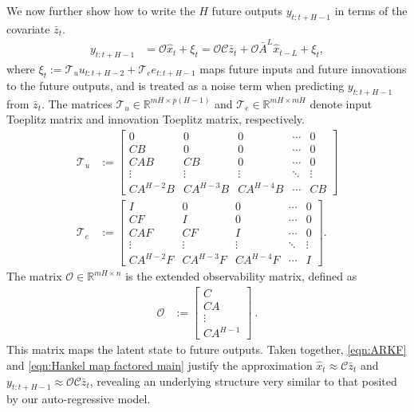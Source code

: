 \documentclass[11pt]{article}
\newcommand{\Abar}{\bar{A}}
\newcommand{\zbar}{\bar{z}}
\newcommand{\xtil}{\hat{x}}
\newcommand{\Ccal}{\mathcal{C}}
\newcommand{\Hcal}{\mathcal{H}}
\newcommand{\Ocal}{\mathcal{O}}
\newcommand{\Tcal}{\mathcal{T}}
\newcommand{\R}{\mathbb{R}}				%
\newcommand{\<}{\langle}
\renewcommand{\>}{\rangle}
\numberwithin{equation}{section}
\begin{document}
We now further show how to write the $H$ future outputs $y_{t:t+H-1}$ in terms of the covariate $\zbar_t$.
\begin{align}\label{eqn:Hankel map factored main}
    y_{t:t+H-1} %
    &= \Ocal \xtil_t + \xi_t
    = \Ocal \Ccal \zbar_t + \Ocal \Abar^L \xtil_{t-L} + \xi_t ,
\end{align}
where $\xi_t := \Tcal_u u_{t:t+H-2} + \Tcal_e e_{t:t+H-1}$ maps future inputs and future innovations to the future outputs, and is treated as a noise term when predicting $y_{t:t+H-1}$ from $\zbar_t$.
The matrices $\Tcal_{u} \in \R^{mH \times p(H-1)}$ and $\Tcal_{e} \in \R^{mH \times mH}$ denote input Toeplitz matrix and innovation Toeplitz matrix, respectively. 
\begin{align*}
    \Tcal_u &:= \begin{bmatrix} 
    0 & 0  & 0 &\cdots & 0 \\
    C B & 0 & 0 &\cdots & 0 \\
    C A B & C B  & 0 & \cdots & 0 \\
    \vdots & \vdots & \vdots & \ddots &\vdots \\
    C A^{H-2} B & C A^{H-3}B & C A^{H-4} B & \cdots & C B 
    \end{bmatrix}  \\
    \Tcal_e &:= \begin{bmatrix} 
    I & 0  & 0 & \cdots & 0 \\
    C F & I & 0 & \cdots & 0 \\
    C A F & C F  & I & \cdots & 0 \\
    \vdots & \vdots & \vdots & \ddots &\vdots \\
    C A^{H-2} F & C A^{H-3} F & C A^{H-4} F & \cdots & I 
    \end{bmatrix}.
\end{align*}
The matrix $\Ocal \in \R^{mH \times n}$ is the extended observability matrix, defined as
\begin{align}
   \Ocal&:= \begin{bmatrix} 
    C \\ C A \\ \vdots \\ C A^{H-1}\end{bmatrix}\:. \label{eqn:extended observability}
\end{align}
This matrix maps the latent state to future outputs. Taken together, \eqref{eqn:ARKF} and \eqref{eqn:Hankel map factored main} justify the approximation $\xtil_{t} \approx \Ccal \zbar_t$ and $y_{t:t+H-1} \approx \Ocal\Ccal \zbar_t$, revealing an underlying structure very similar to that posited by our auto-regressive model.
\end{document}
